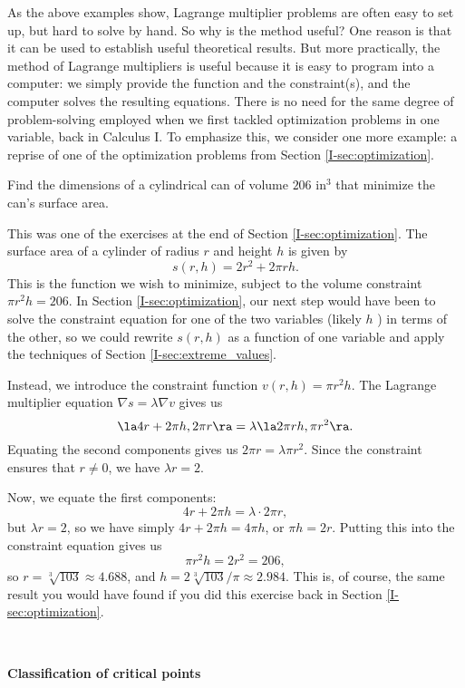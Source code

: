 As the above examples show, Lagrange multiplier problems are often easy to set up, but hard to solve by hand. So why is the method useful? One reason is that it can be used to establish useful theoretical results. But more practically, the method of Lagrange multipliers is useful because it is easy to program into a computer: we simply provide the function and the constraint(s), and the computer solves the resulting equations. There is no need for the same degree of problem-solving employed when we first tackled optimization problems in one variable, back in Calculus I. To emphasize this, we consider one more example: a reprise of one of the optimization problems from Section \ref{I-sec:optimization}.\pagebreak

{
Find the dimensions of a cylindrical can of volume $206 \text{ in}^3$ that minimize the can's surface area.
}
{
This was one of the exercises at the end of Section \ref{I-sec:optimization}. The surface area of a cylinder of radius $r$ and height $h$ is given by
\[
s(r,h) = 2r^2+2\pi rh.
\]
This is the function we wish to minimize, subject to the volume constraint $\pi r^2 h = 206$. In Section \ref{I-sec:optimization}, our next step would have been to solve the constraint equation for one of the two variables (likely $h$ ) in terms of the other, so we could rewrite $s(r,h)$ as a function of one variable and apply the techniques of Section \ref{I-sec:extreme_values}.

Instead, we introduce the constraint function $v(r,h)= \pi r^2 h$. The Lagrange multiplier equation $\nabla s = \lambda \nabla v$ gives us
\[
\la 4r+2\pi h, 2\pi r\ra = \lambda\la 2\pi r h, \pi r^2\ra.
\]
Equating the second components gives us $2\pi r = \lambda\pi r^2$. Since the constraint ensures that $r\neq 0$, we have $\lambda r = 2$.

Now, we equate the first components:
\[
4r+2\pi h = \lambda \cdot 2\pi r,
\]
but $\lambda r =2$, so we have simply $4r+2\pi h = 4\pi h$, or $\pi h = 2r$. Putting this into the constraint equation gives us
\[
\pi r^2 h = 2r^2 = 206,
\]
so $r=\sqrt[3]{103}\approx 4.688$, and $h=2\sqrt[3]{103}/\pi  \approx 2.984$. This is, of course, the same result you would have found if you did this exercise back in Section \ref{I-sec:optimization}.
}\\


\clearpage

\noindent\textbf{\large Classification of critical points}\\

